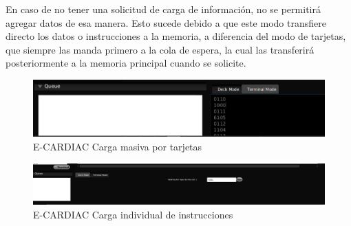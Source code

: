 \documentclass[letterpaper,12pt,oneside]{book}
\begin{document}
	En caso de no tener una solicitud de carga de información,
	no se permitirá agregar datos de esa manera. Esto sucede debido a que este modo transfiere directo los datos o instrucciones a la memoria,
	a diferencia del modo de tarjetas, que siempre las manda primero a la cola de espera, la cual las transferirá posteriormente a la memoria principal cuando se solicite.


	\begin{figure}[h]
 			\centering
			\includegraphics[scale=0.4]{media/ECARDIAC/DeckModeLoaded.png}
			\caption{E-CARDIAC Carga masiva por tarjetas}
			\label{fig:ecardiacDeckMode}
	\end{figure}
	
	\begin{figure}[h]
 			\centering
			\includegraphics[scale=0.25]{media/ECARDIAC/TerminalMode.png}
			\caption{E-CARDIAC Carga individual de instrucciones}
			\label{fig:ecardiacTerminalMode}
	\end{figure}
	
\end{document}
